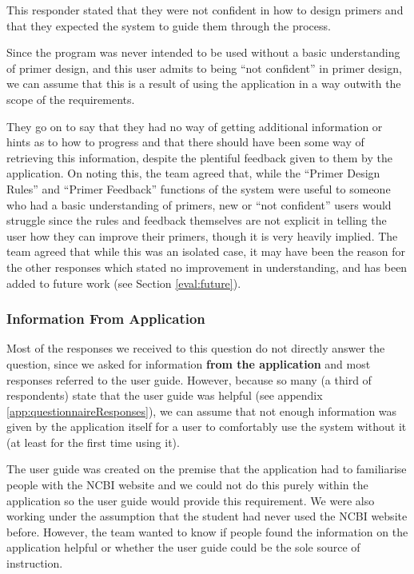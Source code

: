 This responder stated that they were not confident in how to design
primers and that they expected the system to guide them through the
process.

Since the program was never intended to be used without a basic
understanding of primer design, and this user admits to being ``not
confident'' in primer design, we can assume that this is a result of
using the application in a way outwith the scope of the requirements.

They go on to say that they had no way of getting additional
information or hints as to how to progress and that there should have
been some way of retrieving this information, despite the plentiful
feedback given to them by the application.
On noting this, the team agreed that, while the ``Primer Design
Rules'' and ``Primer Feedback'' functions of the system were useful to
someone who had a basic understanding of primers, new or ``not
confident'' users would struggle since the rules and feedback
themselves are not explicit in telling the user how they can improve
their primers, though it is very heavily implied.
The team agreed that while this was an isolated case, it may have been
the reason for the other responses which stated no improvement in
understanding, and has been added to future work (see Section
\ref{eval:future}).

\subsubsection{Information From Application}
Most of the responses we received to this question do not directly
answer the question, since we asked for information \textbf{from the
  application} and most responses referred to the user guide.
However, because so many (a third of respondents) state that the user
guide was helpful (see appendix \ref{app:questionnaireResponses}), we
can assume that not enough information was given by the application
itself for a user to comfortably use the system without it (at least
for the first time using it).

The user guide was created on the premise that the application had to
familiarise people with the NCBI website \cite{ncbi} and we could not
do this purely within the application so the user guide would provide
this requirement.
We were also working under the assumption that the student had never
used the NCBI website \cite{ncbi} before.
However, the team wanted to know if people found the information on the
application helpful or whether the user guide could be the sole source
of instruction.

